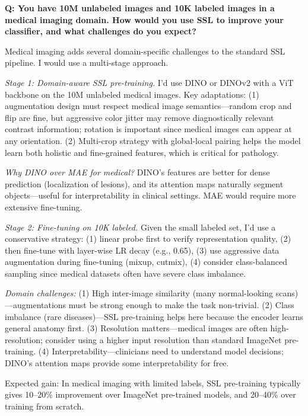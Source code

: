 \begin{interviewq}
\textbf{Q: You have 10M unlabeled images and 10K labeled images in a medical imaging domain. How would you use SSL to improve your classifier, and what challenges do you expect?}

 \quad {} \quad \badgefreq{\freqhigh}

\stronganswer Medical imaging adds several domain-specific challenges to the standard SSL pipeline. I would use a multi-stage approach.

\textit{Stage 1: Domain-aware SSL pre-training.} I'd use DINO or DINOv2 with a ViT backbone on the 10M unlabeled medical images. Key adaptations: (1) augmentation design must respect medical image semantics---random crop and flip are fine, but aggressive color jitter may remove diagnostically relevant contrast information; rotation is important since medical images can appear at any orientation. (2) Multi-crop strategy with global-local pairing helps the model learn both holistic and fine-grained features, which is critical for pathology.

\textit{Why DINO over MAE for medical?} DINO's features are better for dense prediction (localization of lesions), and its attention maps naturally segment objects---useful for interpretability in clinical settings. MAE would require more extensive fine-tuning.

\textit{Stage 2: Fine-tuning on 10K labeled.} Given the small labeled set, I'd use a conservative strategy: (1) linear probe first to verify representation quality, (2) then fine-tune with layer-wise LR decay (e.g., 0.65), (3) use aggressive data augmentation during fine-tuning (mixup, cutmix), (4) consider class-balanced sampling since medical datasets often have severe class imbalance.

\textit{Domain challenges:} (1) High inter-image similarity (many normal-looking scans)---augmentations must be strong enough to make the task non-trivial. (2) Class imbalance (rare diseases)---SSL pre-training helps here because the encoder learns general anatomy first. (3) Resolution matters---medical images are often high-resolution; consider using a higher input resolution than standard ImageNet pre-training. (4) Interpretability---clinicians need to understand model decisions; DINO's attention maps provide some interpretability for free.

Expected gain: In medical imaging with limited labels, SSL pre-training typically gives 10--20\% improvement over ImageNet pre-trained models, and 20--40\% over training from scratch.


\end{interviewq}
